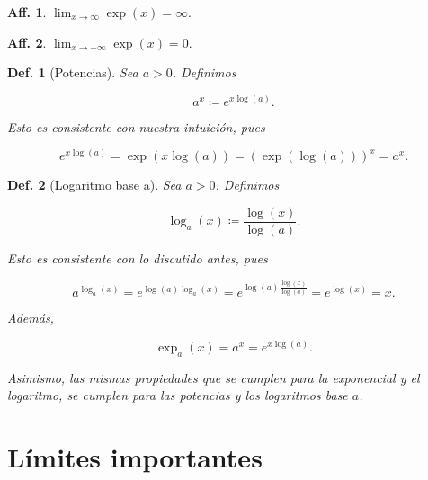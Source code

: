 \documentclass{article}
\theoremstyle{definicion}
\newtheorem{definicion}{Def.}
\theoremstyle{definition}             %
\theoremstyle{definition}             %
\theoremstyle{definition}
\theoremstyle{definition}
\theoremstyle{observacion}
\theoremstyle{definition}
\theoremstyle{plain}
\theoremstyle{definition}
\theoremstyle{afirmacion}
\newtheorem{aff}{Aff.}
\theoremstyle{definition}
\begin{document}
    \begin{aff}
        \(\lim_{x\to\infty} \exp(x) = \infty\).
    \end{aff}

    \begin{aff}
        \(\lim_{x\to -\infty} \exp(x) = 0\).
    \end{aff}

    \begin{definicion}[Potencias]
        Sea \(a > 0\). Definimos

        \begin{equation*}
            a^{x} \coloneq e^{x\log(a)}.
        \end{equation*}

        Esto es consistente con nuestra intuición, pues 

        \begin{equation*}
            e^{x\log(a)} = \exp(x\log(a)) = (\exp(\log(a)))^{x} = a^{x}.
        \end{equation*}
    \end{definicion}

    \begin{definicion}[Logaritmo base a]
        Sea \(a > 0\). Definimos 
        
        \begin{equation*}
            \log_{a}(x) \coloneq \dfrac{\log(x)}{\log(a)}.
        \end{equation*}

        Esto es consistente con lo discutido antes, pues

        \begin{equation*}
            a^{\log_{a}(x)} = e^{\log(a)\log_{a}(x)} = e^{\log(a)\frac{\log(x)}{\log(a)}} = e^{\log(x)} = x.
        \end{equation*}

        Además,

        \begin{equation*}
            \exp_{a}(x) = a^{x} = e^{x\log(a)}.
        \end{equation*}

        Asimismo, las mismas propiedades que se cumplen para la exponencial y el logaritmo, se cumplen para las potencias y los logaritmos base \(a\).
    \end{definicion}

    \section{Límites importantes}
\end{document}
